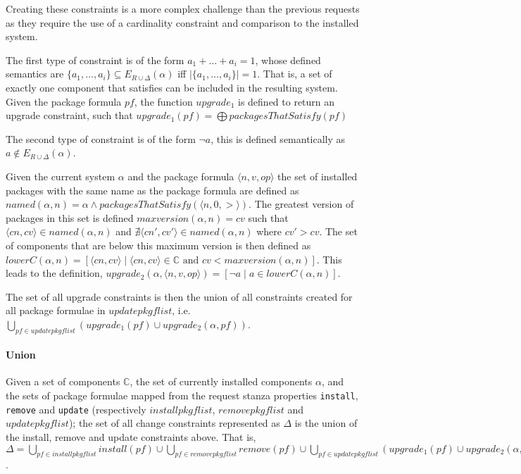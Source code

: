 Creating these constraints is a more complex challenge than the previous requests as they require the use of a cardinality constraint and comparison to the installed system. 

The first type of constraint is of the form $a_1 + \ldots + a_i = 1$, 
whose defined semantics are $\{a_1,\ldots,a_i\} \subseteq E_{R \cup \Delta}(\alpha)$ iff $|\{a_1,\ldots,a_i\}| = 1$.
That is, a set of exactly one component that satisfies can be included in the resulting system.
Given the package formula $pf$, the function $upgrade_1$ is defined to return an upgrade constraint,
such that $upgrade_1(pf) = \bigoplus packagesThatSatisfy(pf)$

The second type of constraint is of the form $\neg a$,
this is defined semantically as $a \not \in E_{R \cup \Delta}(\alpha)$.

Given the current system $\alpha$ and the package formula $\langle n,v,op \rangle$ the set of installed packages with the same name as the package formula are defined as 
$named(\alpha,n) = \alpha \wedge packagesThatSatisfy(\langle n,0,> \rangle)$.
The greatest version of packages in this set is defined 
$maxversion(\alpha,n) = cv$  such that $\langle cn,cv \rangle \in named(\alpha,n)$ and $\nexists \langle cn',cv' \rangle \in named(\alpha,n)$ where $cv' > cv$.
The set of components that are below this maximum version is then defined as
$lowerC(\alpha,n) = [\langle cn,cv \rangle \mid \langle cn,cv \rangle \in \mathbb{C} \mbox{ and } cv < maxversion(\alpha,n)]$.
This leads to the definition, $upgrade_2(\alpha,\langle n,v,op \rangle) = [\neg a \mid a \in lowerC(\alpha,n)]$.

The set of all upgrade constraints is then the union of all constraints created for all package formulae in $updatepkgflist$,
i.e. $\bigcup \limits_{pf \in updatepkgflist} (upgrade_1(pf) \cup upgrade_2(\alpha,pf))$.

\paragraph{Union}
Given a set of components $\mathbb{C}$, the set of currently installed components $\alpha$,
and the sets of package formulae mapped from the request stanza properties \verb+install+, \verb+remove+ and \verb+update+ 
(respectively $installpkgflist$, $removepkgflist$ and $updatepkgflist$);
the set of all change constraints represented as $\Delta$ is the union of the install, remove and update constraints above.
That is, $\Delta = \bigcup \limits_{pf \in installpkgflist} install(pf) 
\cup \bigcup \limits_{pf \in removepkgflist} remove(pf) 
\cup \bigcup \limits_{pf \in updatepkgflist} (upgrade_1(pf) \cup upgrade_2(\alpha,pf))$.


